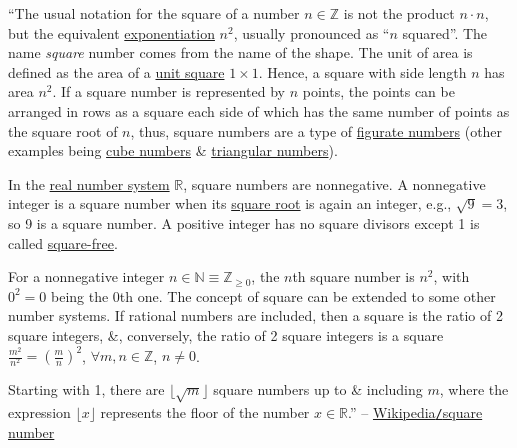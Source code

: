 \documentclass{article}
\begin{document}
``The usual notation for the square of a number $n\in\mathbb{Z}$ is not the product $n\cdot n$, but the equivalent \href{https://en.wikipedia.org/wiki/Exponentiation}{exponentiation} $n^2$, usually pronounced as ``$n$ squared''. The name \textit{square} number comes from the name of the shape. The unit of area is defined as the area of a \href{https://en.wikipedia.org/wiki/Unit_square}{unit square} $1\times1$. Hence, a square with side length $n$ has area $n^2$. If a square number is represented by $n$ points, the points can be arranged in rows as a square each side of which has the same number of points as the square root of $n$, thus, square numbers are a type of \href{https://en.wikipedia.org/wiki/Figurate_number}{figurate numbers} (other examples being \href{https://en.wikipedia.org/wiki/Cube_(algebra)}{cube numbers} \& \href{https://en.wikipedia.org/wiki/Triangular_numbers}{triangular numbers}).

In the \href{https://en.wikipedia.org/wiki/Real_number}{real number system} $\mathbb{R}$, square numbers are nonnegative. A nonnegative integer is a square number when its \href{https://en.wikipedia.org/wiki/Square_root}{square root} is again an integer, e.g., $\sqrt{9} = 3$, so 9 is a square number. A positive integer has no square divisors except 1 is called \href{https://en.wikipedia.org/wiki/Square-free_integer}{square-free}.

For a nonnegative integer $n\in\mathbb{N}\equiv\mathbb{Z}_{\ge0}$, the $n$th square number is $n^2$, with $0^2 = 0$ being the 0th one. The concept of square can be extended to some other number systems. If rational numbers are included, then a square is the ratio of 2 square integers, \&, conversely, the ratio of 2 square integers is a square $\frac{m^2}{n^2} = \left(\frac{m}{n}\right)^2$, $\forall m,n\in\mathbb{Z}$, $n\ne0$.

Starting with 1, there are $\lfloor\sqrt{m}\rfloor$ square numbers up to \& including $m$, where the expression $\lfloor x\rfloor$ represents the floor of the number $x\in\mathbb{R}$.'' -- \href{https://en.wikipedia.org/wiki/Square_number}{Wikipedia{\tt/}square number}
\end{document}

